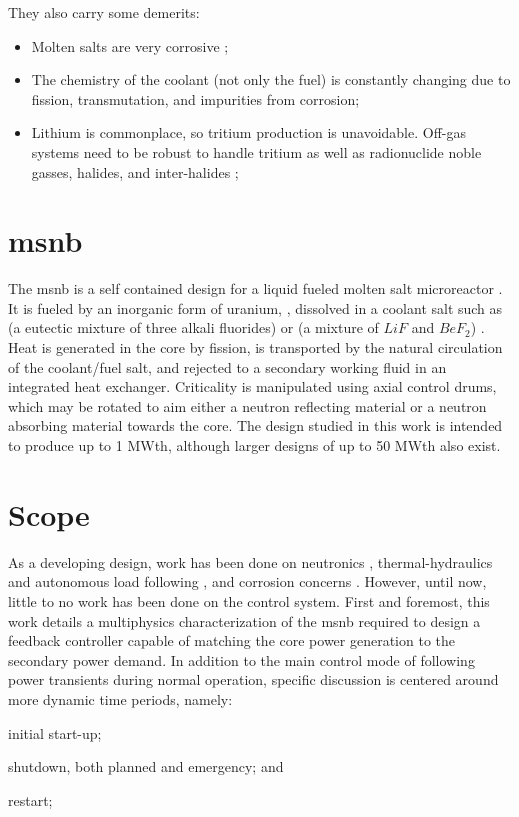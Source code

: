 They also carry some demerits:
\begin{itemize}
    \item Molten salts are very corrosive \cite{RoperRedox};
    \item The chemistry of the coolant (not only the fuel) is constantly changing due to fission, transmutation, and impurities from corrosion;
    \item Lithium is commonplace, so tritium production is unavoidable. Off-gas systems need to be robust to handle tritium as well as radionuclide noble gasses, halides, and inter-halides \cite{HolcombOffgas};
\end{itemize}

\section{\texorpdfstring{\acl{msnb}}{Molten Salt Nuclear Battery}}
The \acf{msnb} is a self contained design for a liquid fueled molten salt microreactor \cite{CarterPHD,PetersonMS}. It is fueled by an inorganic form of uranium, \UF, dissolved in a coolant salt such as \flinak (a eutectic mixture of three alkali fluorides) or \flibe  (a mixture of $LiF$ and $BeF_2$) \cite{RoperOverview}. Heat is generated in the core by fission, is transported by the natural circulation of the coolant/fuel salt, and rejected to a secondary working fluid in an integrated heat exchanger. Criticality is manipulated using axial control drums, which may be rotated to aim either a neutron reflecting material or a neutron absorbing material towards the core. The design studied in this work is intended to produce up to 1 MWth, although larger designs of up to 50 MWth also exist.


\section{Scope}
As a developing design, work has been done on neutronics \cite{PetersonMS}, thermal-hydraulics and autonomous load following \cite{CarterPHD}, and corrosion concerns \cite{RoperPHD}. However, until now, little to no work has been done on the control system. First and foremost, this work details a multiphysics characterization of the \acs{msnb} required to design a feedback controller capable of matching the core power generation to the secondary power demand. In addition to the main control mode of following power transients during normal operation, specific discussion is centered around more dynamic time periods, namely: 
\begin{enumerate*}
    \item initial start-up;
    \item shutdown, both planned and emergency; and
    \item restart;
\end{enumerate*}


